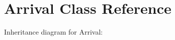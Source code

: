 \hypertarget{classArrival}{}\section{Arrival Class Reference}
\label{classArrival}


Inheritance diagram for Arrival\+:
